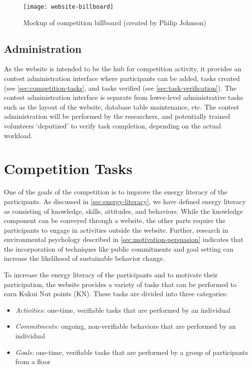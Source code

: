 \begin{figure}[htb]
	\centering
		\texttt{[image: website-billboard]}
		\caption{Mockup of competition billboard (created by Philip Johnson)}
		\label{fig:website-billboard}
\end{figure}

\subsection{Administration}

As the website is intended to be the hub for competition activity, it provides an contest administration interface where participants can be added, tasks created (see \autoref{sec:competition-tasks}, and tasks verified (see \autoref{sec:task-verification}). The contest administration interface is separate from lower-level administrative tasks such as the layout of the website, database table maintenance, etc. The contest administration will be performed by the researchers, and potentially trained volunteers `deputized' to verify task completion, depending on the actual workload.


\section{Competition Tasks}
\label{sec:competition-tasks}

One of the goals of the competition is to improve the energy literacy of the participants. As discussed in \autoref{sec:energy-literacy}, we have defined energy literacy as consisting of knowledge, skills, attitudes, and behaviors. While the knowledge component can be conveyed through a website, the other parts require the participants to engage in activities outside the website. Further, research in environmental psychology described in \autoref{sec:motivation-persuasion} indicates that the incorporation of techniques like public commitments and goal setting can increase the likelihood of sustainable behavior change.

To increase the energy literacy of the participants and to motivate their participation, the website provides a variety of tasks that can be performed to earn Kukui Nut points (KN). These tasks are divided into three categories:

\begin{itemize}
	\item \emph{Activities:} one-time, verifiable tasks that are performed by an individual
	\item \emph{Commitments:} ongoing, non-verifiable behaviors that are performed by an individual
	\item \emph{Goals:} one-time, verifiable tasks that are performed by a group of participants from a floor
\end{itemize}

